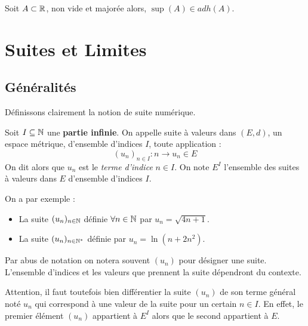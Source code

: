 \begin{proposition}
    Soit $A \subset \mathbb{R}$, non vide et majorée alors, $\sup (A) \in adh(A)$. 
\end{proposition}


\section{Suites et Limites}

\subsection{Généralités}

Définissons clairement la notion de suite numérique. 

\begin{definition}
    Soit $I \subseteq \mathbb{N}$ une \textbf{partie infinie}. 
    On appelle suite à valeurs dans $(E,d)$, un espace métrique, d'ensemble d'indices $I$, 
    toute application : 
        \[ (u_n)_{n \in I} : n \longrightarrow u_n \in E \] 
    On dit alors que $u_n$ est le \emph{terme d'indice} $n \in I$. 
    On note $E^I$ l'ensemble des suites à valeurs dans $E$ d'ensemble d'indices $I$.  
\end{definition}

\begin{example}
    On a par exemple : 
    \begin{itemize}
        \item La suite $(u_n)_{n \in \mathbb{N}}$ définie $ \forall n \in \mathbb{N}$ par $u_n = \sqrt{4n + 1}$. 
        \item La suite $(u_n)_{n \in \mathbb{N}^*}$ définie par $u_n = \ln(n + 2n^2)$. 
    \end{itemize}
\end{example}

\begin{remark}
    Par abus de notation on notera souvent $(u_n)$ pour désigner une suite. L'ensemble d'indices et 
    les valeurs que prennent la suite dépendront du contexte. 

    Attention, il faut toutefois bien différentier la suite $(u_n)$ de son terme général noté $u_n$ 
    qui correspond à une valeur de la suite pour un certain $n \in I$. 
    En effet, le premier élément $(u_n)$ appartient à $E^I$ alors que le second appartient à $E$. 
\end{remark}

